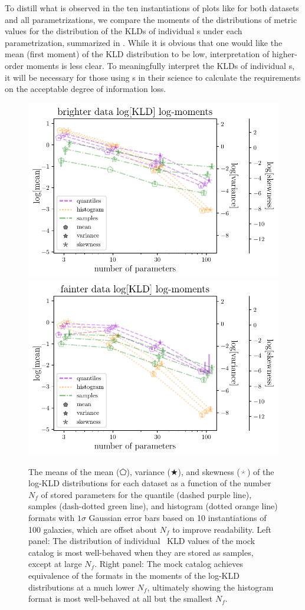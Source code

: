 To distill what is observed in the ten instantiations of plots like 
 for both datasets and all parametrizations, we 
compare the moments of the distributions of metric values for the distribution 
of the KLDs of individual \pz s under each parametrization, summarized in 
.
While it is obvious that one would like the mean (first moment) of the KLD 
distribution to be low, interpretation of higher-order moments is less clear.
To meaningfully interpret the KLDs of individual \pz s, it will be necessary 
for those using \pz s in their science to calculate the requirements on the 
acceptable degree of information loss.
\begin{figure}
	\begin{center}
		\includegraphics[width=0.49\columnwidth]{figures/qp/graham_pz_kld.pdf}
		\includegraphics[width=0.49\columnwidth]{figures/qp/schmidt_pz_kld.pdf}
		\caption{
			The means of the mean ($\pentagon$), variance ($\bigstar$), and skewness 
			($\APLstar$) of the log-KLD distributions for each dataset as a function of the 
			number $N_{f}$ of stored parameters for the quantile (dashed purple line), 
			samples (dash-dotted green line), and histogram (dotted orange line) formats 
			with $1\sigma$ Gaussian error bars based on 10 instantiations of 100 galaxies, 
			which are offset about $N_{f}$ to improve readability.
			Left panel: The distribution of individual \pz\ KLD values of the \mgdata 
			mock catalog is most well-behaved when they are stored as samples, except at 
			large $N_{f}$.
			Right panel: The \ssdata mock catalog achieves equivalence of the formats 
			in the moments of the log-KLD distributions at a much lower $N_{f}$, ultimately 
			showing the histogram format is most well-behaved at all but the smallest 
			$N_{f}$.
			}
	\end{center}
\end{figure}

